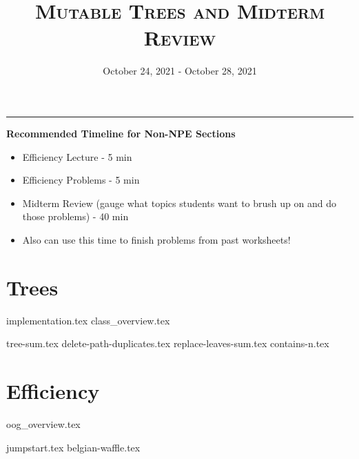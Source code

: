 \documentclass{exam}
\title{\textsc{Mutable Trees and Midterm Review}}
\date{October 24, 2021 - October 28, 2021}
\begin{document}
\maketitle
\rule{\textwidth}{0.15em}
\fontsize{12}{15}\selectfont

\begin{guide}
    \textbf{Recommended Timeline for Non-NPE Sections}
    \begin{itemize}
        \item Efficiency Lecture - 5 min
        \item Efficiency Problems - 5 min
        \item Midterm Review (gauge what topics students want to brush up on and do those problems) - 40 min
        \item Also can use this time to finish problems from past worksheets!
    \end{itemize}
\end{guide}

\section{Trees}
{implementation.tex}
{class_overview.tex}
\begin{questions}
    {tree-sum.tex}
    \newpage
    {delete-path-duplicates.tex}
    \newpage
    {replace-leaves-sum.tex}
    {contains-n.tex}
\end{questions}

\section{Efficiency}
{oog_overview.tex}
\begin{questions}
    {jumpstart.tex}
    {belgian-waffle.tex}
\end{questions}

\newpage
\end{document}
